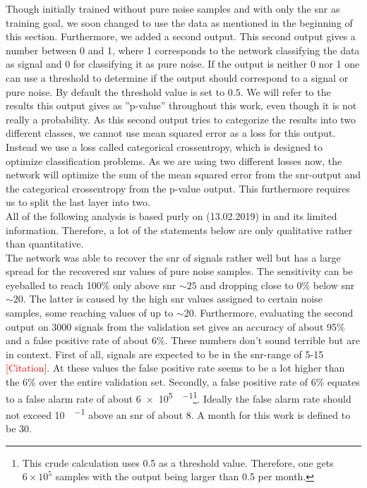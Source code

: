 Though initially trained without pure noise samples and with only the \gls{snr} as training goal, we soon changed to use the data as mentioned in the beginning of this section. Furthermore, we added a second output. This second output gives a number between 0 and 1, where 1 corresponds to the network classifying the data as signal and 0 for classifying it as pure noise. If the output is neither 0 nor 1 one can use a threshold to determine if the output should correspond to a signal or pure noise. By default the threshold value is set to $0.5$. We will refer to the results this output gives as ''p-value'' throughout this work, even though it is not really a probability. As this second output tries to categorize the results into two different classes, we cannot use mean squared error as a loss for this output. Instead we use a loss called categorical crossentropy, which is designed to optimize classification problems. As we are using two different losses now, the network will optimize the sum of the mean squared error from the \gls{snr}-output and the categorical crossentropy from the p-value output. This furthermore requires us to split the last layer into two.\\
All of the following analysis is based purly on (13.02.2019) in \cite{network_wiki} and its limited information. Therefore, a lot of the statements below are only qualitative rather than quantitative.\\
The network was able to recover the \gls{snr} of signals rather well but has a large spread for the recovered \gls{snr} values of pure noise samples. The sensitivity can be eyeballed to reach 100\% only above \gls{snr} $\sim 25$ and dropping close to 0\% below \gls{snr} $\sim 20$. The latter is caused by the high \gls{snr} values assigned to certain noise samples, some reaching values of up to $\sim 20$. Furthermore, evaluating the second output on 3000 signals from the validation set gives an accuracy of about 95\% and a false positive rate of about 6\%. These numbers don't sound terrible but are in context. First of all, signals are expected to be in the \gls{snr}-range of 5-15 \textcolor{red}{[Citation]}. At these values the false positive rate seems to be a lot higher than the 6\% over the entire validation set. Secondly, a false positive rate of 6\% equates to a false alarm rate of about \SI[per-mode=fraction]{6e5}{\samples\per\month}\footnote{This crude calculation uses 0.5 as a threshold value. Therefore, one gets $6\times 10^5$ samples with the output being larger than 0.5 per month.}. Ideally the false alarm rate should not exceed \SI[per-mode=fraction]{10}{\samples\per\month} above an \gls{snr} of about $8$. A month for this work is defined to be \SI{30}{\days}.\medskip\\
